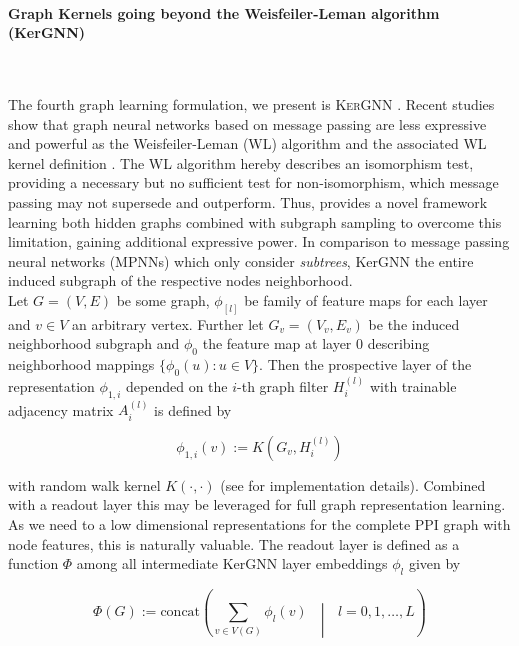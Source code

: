\documentclass[]{article}
\renewcommand{\cite}{\citep}
\begin{document}
\paragraph{Graph Kernels going beyond the Weisfeiler-Leman algorithm (KerGNN)}\mbox{}\\
\label{sec:KerGNN}

The fourth graph learning formulation, we present is \textsc{KerGNN} \citet{feng2022kergnns}. Recent studies \cite{xu2018powerful, morris2019weisfeiler} show that graph neural networks based on message passing are less expressive and powerful as the Weisfeiler-Leman (WL) algorithm \cite{leman1968reduction} and the associated WL kernel definition \cite{shervashidze2009efficient}. The WL algorithm hereby describes an isomorphism test, providing a necessary but no sufficient test for non-isomorphism, which message passing may not supersede and outperform. Thus, \citet{feng2022kergnns} provides a novel framework learning both hidden graphs combined with subgraph sampling to overcome this limitation, gaining additional expressive power. In comparison to message passing neural networks (MPNNs) which only consider \textit{subtrees}, KerGNN the entire induced subgraph of the respective nodes neighborhood. \\

Let $G=(V,E)$ be some graph, $\phi_{[l]}$ be family of feature maps for each layer and $v\in V$ an arbitrary vertex. Further let $G_v=(V_v, E_v)$ be the induced neighborhood subgraph and $\phi_0$ the feature map at layer $0$ describing neighborhood mappings $\{ \phi_0(u):u\in V \}$. Then the prospective layer of the  representation $\phi_{1,i}$ depended on the $i$-th graph filter $H_i^{(l)}$ with trainable adjacency matrix $A_i^{(l)}$ is defined by

\begin{equation}
	\phi_{1,i}(v) := K\left(G_v, H_i^{(l)}\right)
\end{equation}

with random walk kernel $K(\cdot, \cdot)$ (see \citet{feng2022kergnns} for implementation details). Combined with a readout layer this may be leveraged for full graph representation learning. As we need to a low dimensional representations for the complete PPI graph with node features, this is naturally valuable. The readout layer is defined as a function $\Phi$ among all intermediate KerGNN layer embeddings $\phi_l$ given by 

\begin{equation}
	\label{equ:KerGNN}
	\Phi(G):= \text{concat}\left( \sum_{v\in V(G)} \phi_l(v) \text{ }\middle|\text{ } l=0,1,\dots, L \right)
\end{equation} 
\end{document}
